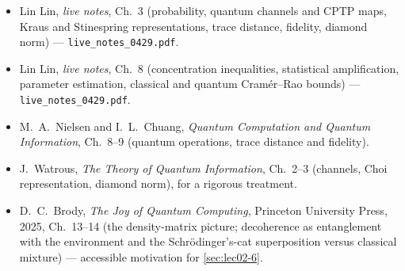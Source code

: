 \readingsection
\begin{itemize}[leftmargin=1.4em]
  \item Lin Lin, \emph{live notes}, Ch.~3 (probability, quantum channels and CPTP
        maps, Kraus and Stinespring representations, trace distance, fidelity,
        diamond norm) --- \texttt{live\_notes\_0429.pdf}.
  \item Lin Lin, \emph{live notes}, Ch.~8 (concentration inequalities, statistical
        amplification, parameter estimation, classical and quantum Cram\'er--Rao
        bounds) --- \texttt{live\_notes\_0429.pdf}.
  \item M.~A.~Nielsen and I.~L.~Chuang, \emph{Quantum Computation and Quantum
        Information}, Ch.~8--9 (quantum operations, trace distance and fidelity).
  \item J.~Watrous, \emph{The Theory of Quantum Information}, Ch.~2--3 (channels,
        Choi representation, diamond norm), for a rigorous treatment.
  \item D.~C.~Brody, \emph{The Joy of Quantum Computing}, Princeton University
        Press, 2025, Ch.~13--14 (the density-matrix picture; decoherence as
        entanglement with the environment and the Schr\"odinger's-cat superposition
        versus classical mixture) --- accessible motivation for
        \cref{sec:lec02-6}.
\end{itemize}
